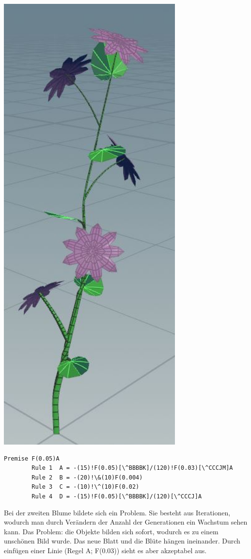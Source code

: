 \documentclass[paper=a4,fontsize=12pt,ngerman]{scrartcl}
\begin{document}
	\begin{minipage}{0.3\textwidth}
		\includegraphics[width=0.7\textwidth]{graphics/flowertwo1.JPG}
	\end{minipage}
	\begin{minipage}{0.7\textwidth}
	\begin{lstlisting}[caption={Flower Two},basicstyle=\scriptsize]
		Premise F(0.05)A
		Rule 1	A = -(15)!F(0.05)[\^BBBBK]/(120)!F(0.03)[\^CCCJM]A
		Rule 2	B = -(20)!\&(10)F(0.004)
		Rule 3	C = -(10)!\^(10)F(0.02)
		Rule 4	D = -(15)!F(0.05)[\^BBBBK]/(120)[\^CCCJ]A
	\end{lstlisting} 
	Bei der zweiten Blume bildete sich ein Problem. Sie besteht aus Iterationen, wodurch man durch Verändern der Anzahl der Generationen ein Wachstum sehen kann. Das Problem: die Objekte bilden sich sofort, wodurch es zu einem unschönen Bild wurde. Das neue Blatt und die Blüte hängen ineinander. Durch einfügen einer Linie (Regel A; F(0.03)) sieht es aber akzeptabel aus.
	\end{minipage}
\end{document}
